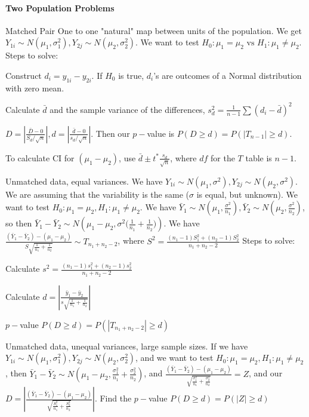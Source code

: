 \documentclass[10pt,letter]{article}
\theoremstyle{plain}
\theoremstyle{definition}
\begin{document}
\paragraph{Two Population Problems}
\begin{casesa}
     \item Matched Pair 
     One to one "natural" map between units of the population. We get $Y_{1i}\sim N(\mu_1,\sigma_1^2),Y_{2j}\sim N(\mu_2,\sigma_2^2)$. We want to test $H_0:\mu_1=\mu_2\text{ vs }H_1:\mu_1\neq\mu_2$.  Steps to solve: \begin{steps}
          \item Construct $d_i=y_{1i}-y_{2i}$. If $H_0$ is true, $d_i$'s are outcomes of a Normal distribution with zero mean. 
          \item Calculate $\bar{d}$ and the sample variance of the differences, $s_d^2=\frac{1}{n-1}\sum(d_i-\bar{d})^2$ 
          \item $D=\left|\frac{\bar{D}-0}{S_d/\sqrt{n}}\right|,d=\left|\frac{\bar{d}-0}{s_d/\sqrt{n}}\right|$. Then our $p-$value is $P(D\geq d)=P(|T_{n-1}|\geq d)$. 
     \end{steps}
     To calculate CI for $(\mu_1-\mu_2)$, use $\bar{d}\pm t^*\frac{s_d}{\sqrt{n}}$, where $df$ for the $T$ table is $n-1$. 
     \item Unmatched data, equal variances. We have $Y_{1i}\sim N(\mu_1,\sigma^2),Y_{2j}\sim N(\mu_2,\sigma^2)$. We are assuming that the variability is the same ($\sigma$ is equal, but unknown). We want to test $H_0:\mu_1=\mu_2,H_1:\mu_1\neq\mu_2$. We have $\bar{Y}_1\sim N(\mu_1,\frac{\sigma^2}{n_1}),\bar{Y}_2\sim N(\mu_2,\frac{\sigma^2}{n_2})$, so then $\bar{Y}_1-\bar{Y}_2\sim N\left(\mu_1-\mu_2,\sigma^2\Big(\frac{1}{n_1}+\frac{1}{n_2}\Big)\right)$. We have $\frac{(\bar{Y}_1-\bar{Y}_2)-(\mu_1-\mu_2)}{S\sqrt{\frac{1}{n_1}+\frac{1}{n_2}}}\sim T_{n_1+n_2-2}$, where $S^2=\frac{(n_1-1)S_1^2+(n_2-1)S_2^2}{n_1+n_2-2}$ Steps to solve: \begin{steps}
          \item Calculate $s^2=\frac{(n_1-1)s_1^2+(n_2-1)s_2^2}{n_1+n_2-2}$ 
          \item Calculate $d=\left|\frac{\bar{y}_1-\bar{y}_2}{s\sqrt{\frac{1}{n_1}+\frac{1}{n_2}}}\right|$ 
          \item $p-$value $P(D\geq d)=P(|T_{n_1+n_2-2}|\geq d)$
     \end{steps}
     \item Unmatched data, unequal variances, large sample sizes. If we have $Y_{1i}\sim N(\mu_1,\sigma_1^2),Y_{2j}\sim N(\mu_2,\sigma_2^2)$, and we want to test $H_0:\mu_1=\mu_2,H_1:\mu_1\neq\mu_2$, then $\bar{Y}_1-\bar{Y}_2\sim N(\mu_1-\mu_2,\frac{\sigma_1^2}{n_1}+\frac{\sigma_2^2}{n_2})$, and $\frac{(\bar{Y}_1-\bar{Y}_2)-(\mu_1-\mu_2)}{\sqrt{\frac{\sigma_1^2}{n_1}+\frac{\sigma_2^2}{n_2}}}=Z$, and our $D=\left|\frac{(\bar{Y}_1-\bar{Y}_2)-(\mu_1-\mu_2)}{\sqrt{\frac{S_1^2}{n_1}+\frac{S_2^2}{n_2}}}\right|$. Find the $p-$value $P(D\geq d)=P(|Z|\geq d)$
\end{casesa}
\end{document}
